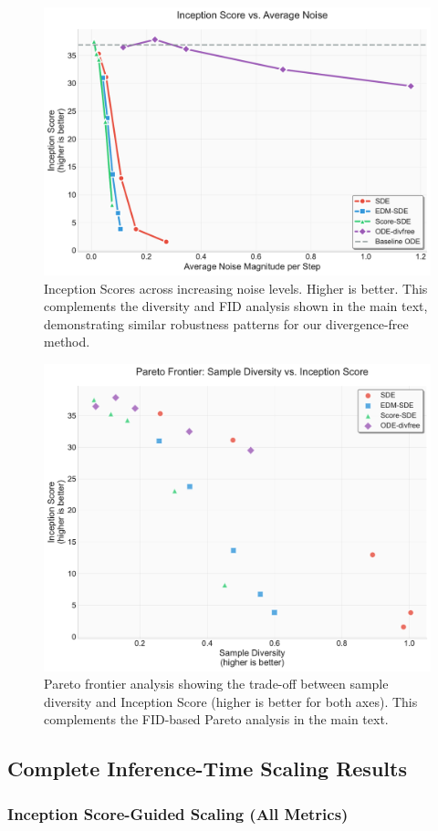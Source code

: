\documentclass{article}
\begin{document}
\begin{figure}[H]
  \centering
  \includegraphics[width=0.7\linewidth]{figures/noise_study_is.pdf}
  \caption{Inception Scores across increasing noise levels. Higher is better. This complements the diversity and FID analysis shown in the main text, demonstrating similar robustness patterns for our divergence-free method.}
  \label{fig:is-noise}
\end{figure}

\begin{figure}[H]
  \centering
  \includegraphics[width=0.7\linewidth]{figures/pareto_diversity_vs_inception.pdf}
  \caption{Pareto frontier analysis showing the trade-off between sample diversity and Inception Score (higher is better for both axes). This complements the FID-based Pareto analysis in the main text.}
  \label{fig:pareto-inception}
\end{figure}

\subsection{Complete Inference-Time Scaling Results}

\subsubsection{Inception Score-Guided Scaling (All Metrics)}
\end{document}
